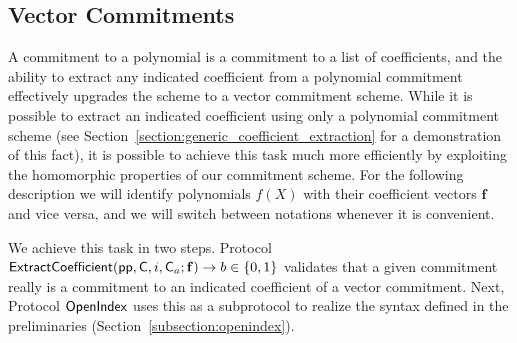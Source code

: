 \documentclass{article}
\theoremstyle{definition}
\begin{document}
\begin{comment}
\subsection{Fix coefficients and negative degrees}
\begin{itemize}
	\item Several ways to do this.
\end{itemize}

\subsection{Range Proofs}

Follows from security proof of Eval.
\end{comment}



\subsection{Vector Commitments}

A commitment to a polynomial is a commitment to a list of coefficients, and the ability to extract any indicated coefficient from a polynomial commitment effectively upgrades the scheme to a vector commitment scheme. While it is possible to extract an indicated coefficient using only a polynomial commitment scheme (see Section~\ref{section:generic_coefficient_extraction} for a demonstration of this fact), it is possible to achieve this task much more efficiently by exploiting the homomorphic properties of our commitment scheme. For the following description we will identify polynomials $f(X)$ with their coefficient vectors $\mathbf{f}$ and vice versa, and we will switch between notations whenever it is convenient.

We achieve this task in two steps. Protocol $\textsf{{ExtractCoefficient}}(\textsf{pp}, \mathsf{C}, i, \mathsf{C}_a; \mathbf{f}) \rightarrow b \in \{0,1\}$ validates that a given commitment really is a commitment to an indicated coefficient of a vector commitment. Next, Protocol $\textsf{{OpenIndex}}$ uses this as a subprotocol to realize the syntax defined in the preliminaries (Section~\ref{subsection:openindex}). 
\end{document}
